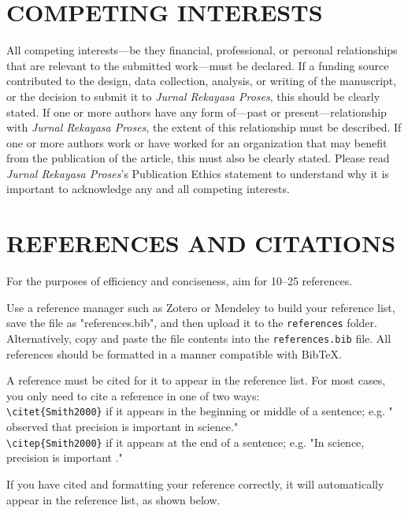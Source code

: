 \documentclass[twocolumn,twoside]{base/jrekpros}
\begin{document}
\section*{COMPETING INTERESTS}

All competing interests—be they financial, professional, or personal relationships that are relevant to the submitted work—must be declared. If a funding source contributed to the design, data collection, analysis, or writing of the manuscript, or the decision to submit it to \textit{Jurnal Rekayasa Proses}, this should be clearly stated. If one or more authors have any form of—past or present—relationship with \textit{Jurnal Rekayasa Proses}, the extent of this relationship must be described. If one or more authors work or have worked for an organization that may benefit from the publication of the article, this must also be clearly stated. Please read \textit{Jurnal Rekayasa Proses}’s Publication Ethics statement to understand why it is important to acknowledge any and all competing interests.

\section*{REFERENCES AND CITATIONS} %

For the purposes of efficiency and conciseness, aim for 10--25 references.

Use a reference manager such as Zotero or Mendeley to build your reference list, save the file as "references.bib", and then upload it to the \verb|references| folder. Alternatively, copy and paste the file contents into the \verb|references.bib| file. All references should be formatted in a manner compatible with BibTeX. 

A reference must be cited for it to appear in the reference list. For most cases, you only need to cite a reference in one of two ways: \\

\noindent \verb|\citet{Smith2000}| if it appears in the beginning or middle of a sentence; e.g. "\citet{Smith2000} observed that precision is important in science." \\

\noindent \verb|\citep{Smith2000}| if it appears at the end of a sentence; e.g. "In science, precision is important \citep{Smith2000}."

If you have cited and formatting your reference correctly, it will automatically appear in the reference list, as shown below.



\atColsEnd{\vfill} %
\end{document}
